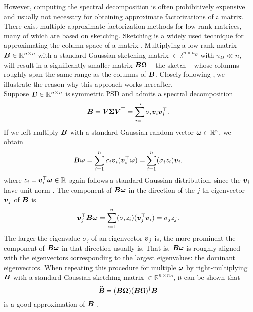 However, computing the spectral
decomposition is often prohibitively expensive and usually not necessary for
obtaining approximate factorizations of a matrix. There exist multiple approximate
factorization methods for low-rank matrices, many of which are based on sketching.
Sketching is a widely used technique for approximating the column space of a matrix
\cite{halko2011finding,woodruff2014sketching,lin2017randomized,tropp2017sketching,tropp2023randomized}.
Multiplying a low-rank matrix $\boldsymbol{B} \in \mathbb{R}^{n \times n}$ with a standard Gaussian
\gls{sketching-matrix} $\in \mathbb{R}^{n \times n_{\Omega}}$ with $n_{\Omega} \ll n$, will
result in a significantly smaller matrix $\boldsymbol{B}\boldsymbol{\Omega}$ -- the sketch -- whose
columns roughly span the same range as the columns of $\boldsymbol{B}$.
Closely following \cite[section~2.1]{tropp2023randomized}, we illustrate the
reason why this approach works hereafter.\\

Suppose $\boldsymbol{B} \in \mathbb{R}^{n \times n}$ is symmetric \gls{PSD} and admits a spectral decomposition
\begin{equation}
    \boldsymbol{B}
        = \boldsymbol{V} \boldsymbol{\Sigma} \boldsymbol{V}^{\top} 
        = \sum_{i=1}^n \sigma_i \boldsymbol{v}_i \boldsymbol{v}_i^{\top}.
    \label{equ:3-nystrom-sketching-spectral-decomposition}
\end{equation}
If we left-multiply $\boldsymbol{B}$ with a standard Gaussian random vector $\boldsymbol{\omega} \in \mathbb{R}^n$,
we obtain
\begin{equation}
    \boldsymbol{B}\boldsymbol{\omega}
        = \sum_{i=1}^n \sigma_i \boldsymbol{v}_i (\boldsymbol{v}_i^{\top} \boldsymbol{\omega})
        = \sum_{i=1}^n (\sigma_i  z_i) \boldsymbol{v}_i,
        \label{equ:3-nystrom-sketching-random-multiplication}
\end{equation}
where $z_i = \boldsymbol{v}_i^{\top} \boldsymbol{\omega} \in \mathbb{R}$ again follows a
standard Gaussian distribution, since the $\boldsymbol{v}_i$ have unit norm
\cite{klenke2013probability}. The component of $\boldsymbol{B}\boldsymbol{\omega}$ in the
direction of the $j$-th eigenvector $\boldsymbol{v}_j$ of $\boldsymbol{B}$ is
\begin{equation}
    \boldsymbol{v}_j^{\top}\boldsymbol{B}\boldsymbol{\omega}
        = \sum_{i=1}^n (\sigma_i  z_i) (\boldsymbol{v}_j^{\top} \boldsymbol{v}_i)
        = \sigma_j  z_j.
        \label{equ:3-nystrom-sketching-dominant-component}
\end{equation}
The larger the eigenvalue $\sigma_j$ of an eigenvector $\boldsymbol{v}_j$ is, the
more prominent the component of $\boldsymbol{B}\boldsymbol{\omega}$ in that direction usually is.
That is, $\boldsymbol{B}\boldsymbol{\omega}$ is roughly aligned with the eigenvectors corresponding
to the largest eigenvalues: the dominant eigenvectors.
When repeating this procedure for multiple $\boldsymbol{\omega}$ by right-multiplying $\boldsymbol{B}$
with a standard Gaussian \gls{sketching-matrix} $\in \mathbb{R}^{n \times n_{\Omega}}$,
it can be shown that
\begin{equation}
    \widehat{\boldsymbol{B}} = (\boldsymbol{B} \boldsymbol{\Omega}) (\boldsymbol{B} \boldsymbol{\Omega})^{\dagger} \boldsymbol{B}
    \label{equ:3-nystrom-RSVD}
\end{equation}
is a good approximation of $\boldsymbol{B}$ \cite{halko2011finding}.\\


